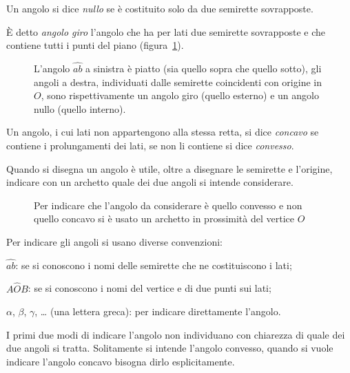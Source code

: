 \begin{definizione}
Un angolo si dice \emph{nullo} se è costituito solo da due semirette 
sovrapposte.
\end{definizione}

\begin{definizione}
\`E detto \emph{angolo giro} l'angolo che ha per lati due semirette 
sovrapposte e che contiene tutti i punti del piano 
(figura~\ref{fig:1.19}).
\end{definizione}

\begin{inaccessibleblock}
 \begin{figure}[bth]
 \centering 
 \caption{L'angolo  \(\widehat{ab}\) a sinistra è piatto (sia quello 
sopra che quello sotto), gli angoli a destra, individuati dalle 
semirette coincidenti con origine in \(O\), sono rispettivamente un 
angolo giro (quello esterno) e un angolo nullo (quello 
interno).}\label{fig:1.19}
\end{figure}
\end{inaccessibleblock}

\begin{definizione}
Un angolo, i cui lati non appartengono alla stessa retta, si dice 
\emph{concavo} se contiene i prolungamenti dei lati, se non li 
contiene si dice \emph{convesso}.
\end{definizione}

\begin{figure*}[htb]
\centering  
\caption{L'angolo concavo è quello in giallo in quanto contiene i 
prolungamenti dei lati (punteggiati)}\label{fig:1.20}
\end{figure*}

Quando si disegna un angolo è utile, oltre a disegnare le semirette e 
l'origine, indicare con un archetto quale dei due angoli si intende 
considerare.


\begin{inaccessibleblock}
 \begin{figure}[htb]
 \centering 
\caption{Per indicare che l'angolo da considerare è quello convesso e 
non quello concavo si è usato un archetto in prossimità del vertice 
\(O\)}\label{fig:1.21}
\end{figure}
\end{inaccessibleblock}

Per indicare gli angoli si usano diverse convenzioni:
\begin{itemize*}
\item  \(\widehat{ab}\): se si conoscono i nomi delle semirette che ne 
costituiscono i lati;
\item  \(A\widehat{O}B\): se si conoscono i nomi del vertice e di due 
punti sui lati;
\item  \(\alpha\), \(\beta\), \(\gamma\), \ldots{} (una lettera greca): per 
indicare direttamente l'angolo.
\end{itemize*}
I primi due modi di indicare l'angolo non individuano con chiarezza 
di quale dei due angoli si tratta. Solitamente si intende l'angolo 
convesso, quando si vuole indicare l'angolo concavo bisogna dirlo 
esplicitamente.

